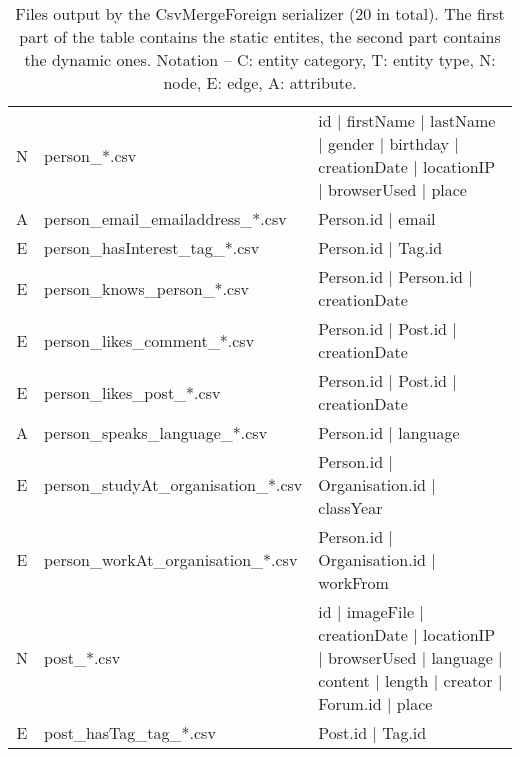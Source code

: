 \begin{table}[htb]
{\begin{tabular}{|c|p{4.3cm}|p{12.4cm}|}
        \hline
        N                       & person\_*.csv                        & id | firstName | lastName | gender | birthday | creationDate | locationIP | browserUsed | place                     \\
        A                       & person\_email\_emailaddress\_*.csv   & Person.id | email                                                                                                   \\
        E                       & person\_hasInterest\_tag\_*.csv      & Person.id | Tag.id                                                                                                  \\
        E                       & person\_knows\_person\_*.csv         & Person.id | Person.id | creationDate                                                                                \\
        E                       & person\_likes\_comment\_*.csv        & Person.id | Post.id | creationDate                                                                                  \\
        E                       & person\_likes\_post\_*.csv           & Person.id | Post.id | creationDate                                                                                  \\
        A                       & person\_speaks\_language\_*.csv      & Person.id | language                                                                                                \\
        E                       & person\_studyAt\_organisation\_*.csv & Person.id | Organisation.id | classYear                                                                             \\
        E                       & person\_workAt\_organisation\_*.csv  & Person.id | Organisation.id | workFrom                                                                              \\
        \hline
        N                       & post\_*.csv                          & id | imageFile | creationDate | locationIP | browserUsed | language | content | length | creator | Forum.id | place \\
        E                       & post\_hasTag\_tag\_*.csv             & Post.id | Tag.id                                                                                                    \\
        \hline
    \end{tabular}}
    \caption{Files output by the CsvMergeForeign serializer (20 in total). The first part of the table contains the static entites, the second part contains the dynamic ones. Notation -- C: entity category, T: entity type, N: node, E: edge, A: attribute.}
    \label{table:csv_merge_foreign}
\end{table}
